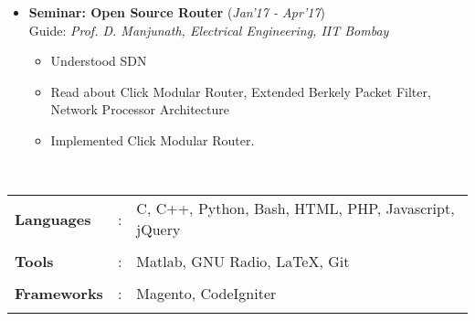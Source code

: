 \documentclass[10pt]{article}
\newcommand\hs{1.3mm}		%
\begin{document}
\begin{itemize}[leftmargin=0.4cm]
\item \textbf{Seminar: Open Source Router}
\hfill{(\textit{Jan'17 - Apr'17})}\\
Guide: \textit{Prof. D. Manjunath, Electrical Engineering, IIT Bombay}\\\vspace{-0.68cm}
	\begin{itemize}
	\item Understood SDN\vspace{-0.1cm}
	\item Read about Click Modular Router, Extended Berkely Packet Filter, Network Processor Architecture\vspace{-0.1cm}
	\item Implemented Click Modular Router.
	\end{itemize}

    

\end{itemize}
\vspace{-0.05cm}

\colorbox{bl}{}\\
\begin{tabular}{m{2in}m{0.20in}m{4.5in}}
	\\[-3mm]
	\hspace{\hs} \hspace{0.12cm}\textbf{\textbf{Languages}} &: & {{C, C++, Python, Bash, HTML, PHP, Javascript, jQuery}} \\
	\\[-3.5mm]
	\hspace{\hs} \hspace{0.12cm}\textbf{\textbf{Tools}} &: & {Matlab, GNU Radio, \LaTeX, Git}\\
	\\[-3.5mm]
	\hspace{\hs} \hspace{0.12cm}\textbf{\textbf{Frameworks}} &: & {Magento, CodeIgniter}\\
	\\[-4mm]
\end{tabular}\\

	\colorbox{bl}{}%
	\vspace{0.15cm} 
\end{document}
